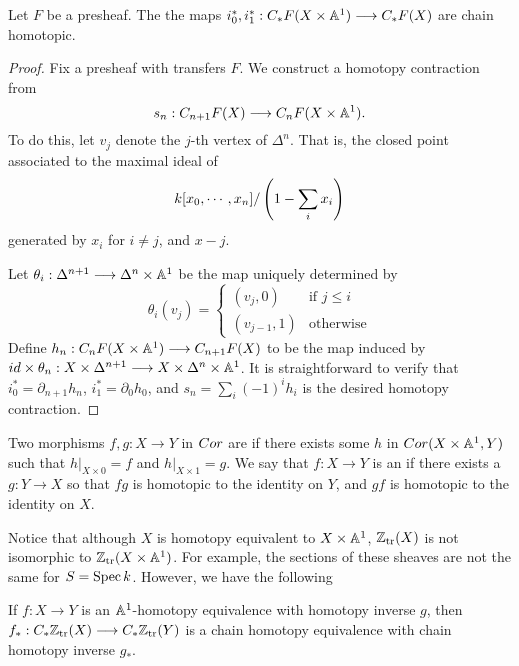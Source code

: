 \begin{lem}\label{lem_hi_implies_i0_i1_homotopic}
Let $F$ be a presheaf. The the maps $i_0^*, i_1^* : 
\suslC F(X \times \A^1) \to \suslC F(X)$ are chain homotopic.
\end{lem}
\begin{proof}
Fix a presheaf with transfers $F$. We construct a homotopy 
contraction from
\[
s_n : \suslC[n + 1] F(X) \to \suslC[n] F(X \times \A^1).
\]
To do this, let $v_j$ denote the $j$-th vertex of $\Delta^n$. That
is, the closed point associated to the maximal ideal of
\[
\basefield [x_0,\cdots,x_{n}]/\left(1 - \sum_{i} x_i \right)
\]
generated by $x_i$ for $i \neq j$, and $x - j$.

Let $\theta_i: \Delta^{n + 1} \to \Delta^n \times \A^1$ be the map
uniquely determined by
\[
\theta_i(v_j) = \begin{cases}
(v_j, 0) & \textrm{if }j \leq i \\
(v_{j - 1}, 1) & \textrm{otherwise}
\end{cases}
\]
Define $h_n : \suslC[n] F(X \times \A^1) \to \suslC[n + 1] F(X)$ 
to be the map induced by $id \times \theta_n : X \times 
\Delta^{n + 1} \to X \times \Delta^n \times \A^1$. It is 
straightforward to verify that $i_0^* = \partial_{n + 1}h_n$,
$i_1^* = \partial_0 h_0$, and $s_n = \sum_i (-1)^i h_i$ is the 
desired homotopy contraction.
\end{proof}

\begin{defn}
Two morphisms $f, g: X \to Y$ in $\Cor$ are  
if there exists some $h$ in $\Cor(X \times \A^1, Y)$ such that 
$h|_{X \times 0} = f$ and $h|_{X \times 1} = g$. We say that $f: X 
\to Y$ is an  if there exists a 
$g: Y \to X$ so that $fg$ is homotopic to the identity on $Y$, and
$gf$ is homotopic to the identity on $X$.
\end{defn}

Notice that although $X$ is homotopy equivalent to $X \times \A^1$,
$\Ztr(X)$ is not isomorphic to $\Ztr(X \times \A^1)$. For example,
the sections of these sheaves are not the same for $S = \Spec 
\basefield$. However, we have the following

\begin{prop}\label{prop_a1_hom_implies_hom}
If $f: X \to Y$ is an $\A^1$-homotopy equivalence with homotopy
inverse $g$, then $f_*: \suslC \Ztr(X) \to \suslC \Ztr(Y)$ is a 
chain homotopy equivalence with chain homotopy inverse $g_*$.
\end{prop}

